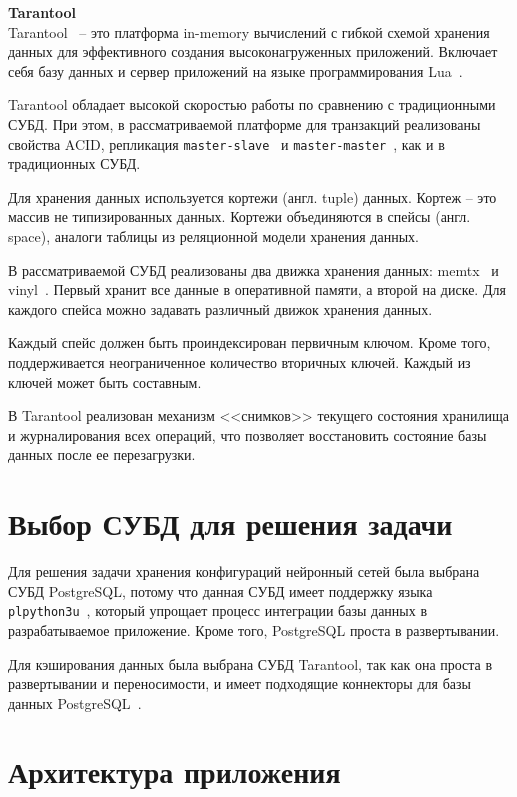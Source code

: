 \noindent\textbf{Tarantool}\\

Tarantool~\cite{tarantool} -- это платформа in-memory вычислений с гибкой схемой хранения данных для эффективного создания высоконагруженных приложений. Включает себя базу данных и сервер приложений на языке программирования Lua~\cite{lua}.

Tarantool обладает высокой скоростью работы по сравнению с традиционными СУБД. При этом, в рассматриваемой платформе для транзакций реализованы свойства ACID, репликация \texttt{master-slave}~\cite{master-slave} и \texttt{master-master}~\cite{master-master}, как и в традиционных СУБД.

Для хранения данных используется кортежи (англ. tuple) данных. Кортеж -- это массив не типизированных данных. Кортежи объединяются в спейсы (англ. space), аналоги таблицы из реляционной модели хранения данных.

В рассматриваемой СУБД реализованы два движка хранения данных: memtx~\cite{memtx-vinyl} и vinyl~\cite{memtx-vinyl}. Первый хранит все данные в оперативной памяти, а второй на диске. Для каждого спейса можно задавать различный движок хранения данных. 

Каждый спейс должен быть проиндексирован первичным ключом. Кроме того, поддерживается неограниченное количество вторичных ключей. Каждый из ключей может быть составным.

В Tarantool реализован механизм <<снимков>> текущего состояния хранилища и журналирования всех операций, что позволяет восстановить состояние базы данных после ее перезагрузки.

\section{Выбор СУБД для решения задачи}

Для решения задачи хранения конфигураций нейронный сетей была выбрана СУБД PostgreSQL, потому что данная СУБД имеет поддержку языка \texttt{plpython3u}~\cite{plpython3u}, который упрощает процесс интеграции базы данных в разрабатываемое приложение. Кроме того, PostgreSQL проста в развертывании.

Для кэширования данных была выбрана СУБД Tarantool, так как она проста в развертывании и переносимости, и имеет подходящие коннекторы для базы данных PostgreSQL~\cite{postgresql-fact}.

\section{Архитектура приложения}

